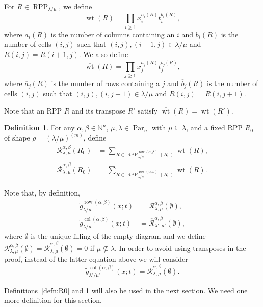 \documentclass[12pt]{amsart}
\numberwithin{equation}{section}
\theoremstyle{definition}
\newtheorem{defn}[thm]{Definition}
\newcommand\wg{\widetilde{g}}
\newcommand\col{\operatorname{col}}
\newcommand\row{\operatorname{row}}
\newcommand\NN{\mathbb{N}}
\newcommand\Par{\operatorname{Par}}
\newcommand\RPP{\operatorname{RPP}}
\newcommand\lm{{\lambda/\mu}}
\newcommand\wt{\operatorname{wt}}
\newcommand\R{\mathcal{R}}
\newcommand\oR{\overline{\R}}
\newcommand\owt{\overline{\wt}}
\begin{document}
For $R\in\RPP_{\lm}$, we define
\[
\wt(R)=\prod_{i\ge1}x_i^{a_i(R)} t_i^{b_i(R)},
\]
where $a_i(R)$ is the number of columns containing an $i$ and $b_i(R)$ is the
number of cells $(i,j)$ such that $(i,j),(i+1,j)\in\lm$ and $R(i,j)=R(i+1,j)$.
We also define
\[
\owt(R)=\prod_{j\ge1}x_j^{\overline{a}_j(R)} t_j^{\overline{b}_j(R)},
\]
where $\overline{a}_j(R)$ is the number of rows containing a $j$ and
$\overline{b}_j(R)$ is the number of cells $(i,j)$ such that
$(i,j),(i,j+1)\in\lm$ and $R(i,j)=R(i,j+1)$.



Note that an RPP $R$ and its transpose $R'$ satisfy
$\owt(R)=\wt(R')$.


\begin{defn}\label{defn:R}
  For any $\alpha,\beta\in\NN^n$, $\mu,\lambda\in\Par_n$ with
  $\mu\subseteq\lambda$, and a fixed RPP $R_0$ of shape $\rho=(\lm)^{(m)}$,
  define
\begin{align*}
  \R^{\alpha,\beta}_{\lambda,\mu}(R_0)
    &=\sum_{R\in \RPP^{\row(\alpha,\beta)}_{\lm}(R_0)} \wt(R),\\
  \oR^{\alpha,\beta}_{\lambda,\mu}(R_0)
    &=\sum_{R\in \RPP^{\row(\alpha,\beta)}_{\lm}(R_0)} \owt(R).
\end{align*}
\end{defn}

Note that, by definition,
\begin{align*}
  \wg_{\lambda/\mu}^{\row(\alpha,\beta)}(x;t) &= \R^{\alpha,\beta}_{\lambda,\mu}(\emptyset),\\
  \wg_{\lambda/\mu}^{\col(\alpha,\beta)}(x;t) &=\oR^{\alpha,\beta}_{\lambda',\mu'}(\emptyset),
\end{align*}
where $\emptyset$ is the unique filling of the empty diagram and we define
$\R^{\alpha,\beta}_{\lambda,\mu}(\emptyset)=\oR^{\alpha,\beta}_{\lambda,\mu}(\emptyset)=0$
if $\mu\not\subseteq\lambda$. In order to avoid using transposes in the proof,
instead of the latter equation above we will consider
\[
  \wg_{\lambda'/\mu'}^{\col(\alpha,\beta)}(x;t)
  =\oR^{\alpha,\beta}_{\lambda,\mu}(\emptyset).
\]

Definitions~\ref{defn:R0} and \ref{defn:R} will also be used in the next section.
We need one more definition for this section.
\end{document}
